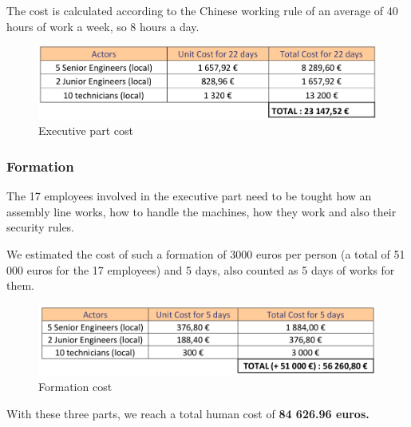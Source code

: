 	The cost is calculated according to the Chinese working rule of an average of 40 hours of work a week, so 8 hours a day.

	\begin{figure}[h]

	\centering
	\includegraphics[scale=0.6]{Img/secondPartHumanCost.png}
	\caption{Executive part cost}

	\end{figure}

\subsubsection{Formation}
	The 17 employees involved in the executive part need to be tought how an assembly line works, how to handle the machines, how they work and also their security rules. 

	We estimated the cost of such a formation of 3000 euros per person (a total of 51 000 euros for the 17 employees) and 5 days, also counted as 5 days of works for them.

	\begin{figure}[h]

	\centering
	\includegraphics[scale=0.6]{Img/formationCost.png}
	\caption{Formation cost}

	\end{figure}

With these three parts, we reach a total human cost of \textbf{84 626.96 euros.} \\

